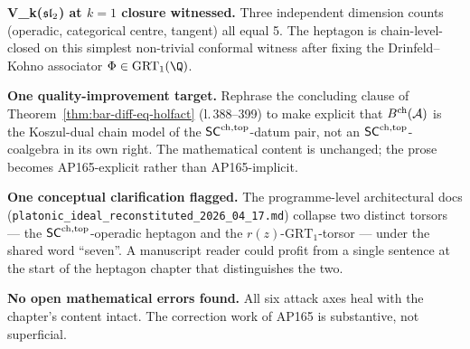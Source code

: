 \textbf{V_k($\mathfrak{sl}_2$) at $k = 1$ closure witnessed.} Three independent dimension counts (operadic, categorical centre, tangent) all equal 5. The heptagon is chain-level-closed on this simplest non-trivial conformal witness after fixing the Drinfeld--Kohno associator $\Phi \in \mathrm{GRT}_1(\Q)$.

\textbf{One quality-improvement target.} Rephrase the concluding clause of Theorem~\ref*{thm:bar-diff-eq-holfact} (l.\,388--399) to make explicit that $B^{\mathrm{ch}}(\mathcal{A})$ is the Koszul-dual chain model of the $\mathsf{SC}^{\mathrm{ch},\mathrm{top}}$-datum pair, not an $\mathsf{SC}^{\mathrm{ch},\mathrm{top}}$-coalgebra in its own right. The mathematical content is unchanged; the prose becomes AP165-explicit rather than AP165-implicit.

\textbf{One conceptual clarification flagged.} The programme-level architectural docs (\texttt{platonic\_ideal\_reconstituted\_2026\_04\_17.md}) collapse two distinct torsors --- the $\mathsf{SC}^{\mathrm{ch},\mathrm{top}}$-operadic heptagon and the $r(z)$-$\mathrm{GRT}_1$-torsor --- under the shared word ``seven''. A manuscript reader could profit from a single sentence at the start of the heptagon chapter that distinguishes the two.

\textbf{No open mathematical errors found.} All six attack axes heal with the chapter's content intact. The correction work of AP165 is substantive, not superficial.
